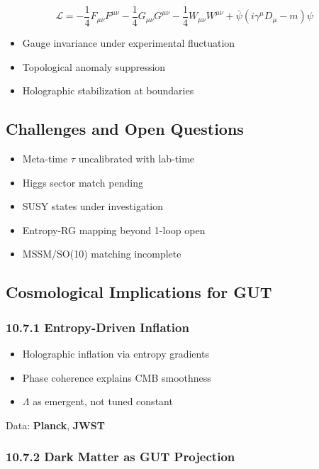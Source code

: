 \documentclass[10.5pt,a4paper]{article}
\begin{document}
\[
    \mathcal{L} = -\frac{1}{4} F_{\mu\nu}F^{\mu\nu} - \frac{1}{4} G_{\mu\nu}G^{\mu\nu} - \frac{1}{4} W_{\mu\nu}W^{\mu\nu} + \bar{\psi}(i\gamma^\mu D_\mu - m)\psi
\]

\begin{itemize}
    \item Gauge invariance under experimental fluctuation
    \item Topological anomaly suppression
    \item Holographic stabilization at boundaries
\end{itemize}

\subsection{Challenges and Open Questions}

\begin{itemize}
    \item Meta-time \( \tau \) uncalibrated with lab-time
    \item Higgs sector match pending
    \item SUSY states under investigation
    \item Entropy-RG mapping beyond 1-loop open
    \item MSSM/SO(10) matching incomplete
\end{itemize}

\subsection{Cosmological Implications for GUT}

\subsubsection*{10.7.1 Entropy-Driven Inflation}

\begin{itemize}
    \item Holographic inflation via entropy gradients
    \item Phase coherence explains CMB smoothness
    \item \(\Lambda\) as emergent, not tuned constant
\end{itemize}

Data: \textbf{Planck}, \textbf{JWST}

\subsubsection*{10.7.2 Dark Matter as GUT Projection}
\end{document}
